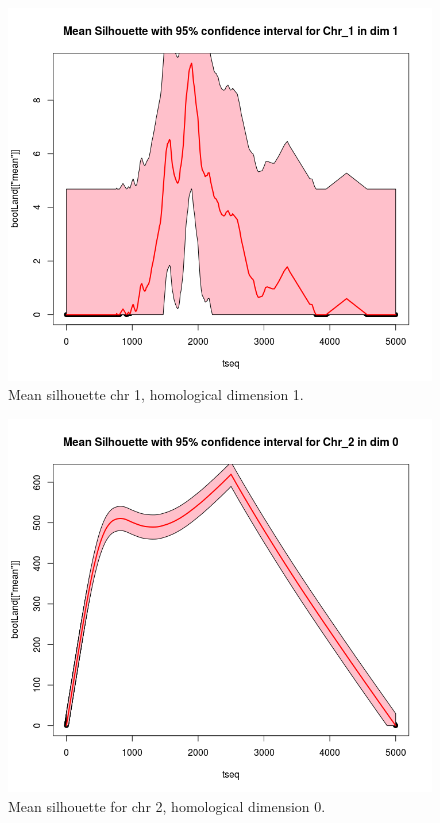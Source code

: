 \documentclass[12pt,a4paper]{article}
\begin{document}
\begin{figure}[hbtp]
\centering
\includegraphics[scale=0.75]{meanSil_chr1_dim1.png}
\caption{Mean silhouette chr 1, homological dimension 1.}
\label{fig:meanSil_chr1_dim1}
\end{figure}

\begin{figure}[hbtp]
\centering
\includegraphics[scale=0.75]{meanSil_chr2_dim0.png}
\caption{Mean silhouette for chr 2, homological dimension 0.}
\label{fig:meanSil_chr2_dim0}
\end{figure}
\end{document}
